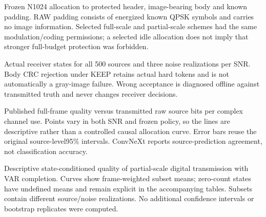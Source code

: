 \caption{Frozen N1024 allocation to protected header, image-bearing body and known padding. RAW padding consists of energized known QPSK symbols and carries no image information. Selected full-scale and partial-scale schemes had the same modulation/coding permissions; a selected idle allocation does not imply that stronger full-budget protection was forbidden.}
\caption{Actual receiver states for all 500 sources and three noise realizations per SNR. Body CRC rejection under KEEP retains actual hard tokens and is not automatically a gray-image failure. Wrong acceptance is diagnosed offline against transmitted truth and never changes receiver decisions.}
\caption{Published full-frame quality versus transmitted raw source bits per complex channel use. Points vary in both SNR and frozen policy, so the lines are descriptive rather than a controlled causal allocation curve. Error bars reuse the original source-level95\% intervals. ConvNeXt reports source-prediction agreement, not classification accuracy.}
\caption{Descriptive state-conditioned quality of partial-scale digital transmission with VAR completion. Curves show frame-weighted subset means; zero-count states have undefined means and remain explicit in the accompanying tables. Subsets contain different source/noise realizations. No additional confidence intervals or bootstrap replicates were computed.}
